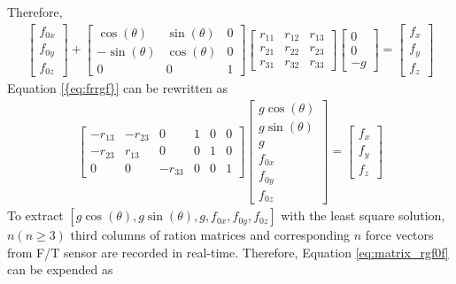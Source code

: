 Therefore,
\begin{equation}
\label{eq:frrgf}
\begin{split}
\begin{bmatrix}
f_{0x}\\
f_{0y}\\
f_{0z}
\end{bmatrix}
+
\begin{bmatrix}
\cos(\theta)	&\sin(\theta)	&0 \\
-\sin(\theta)	&\cos(\theta)	&0 \\
0				&0				&1
\end{bmatrix}
\begin{bmatrix}
r_{11}		&r_{12}		&r_{13} \\
r_{21}		&r_{22}		&r_{23} \\
r_{31}		&r_{32}		&r_{33}
\end{bmatrix}
\begin{bmatrix}
0\\
0\\
-g
\end{bmatrix}
=
\begin{bmatrix}
f_x\\
f_y\\
f_z
\end{bmatrix}
\end{split}
\end{equation}
Equation \ref{{eq:frrgf}} can be rewritten as 
\begin{equation}
\label{eq:matrix_rgf0f}
\begin{split}
\begin{bmatrix}
-r_{13}		&-r_{23} 	&0			&1		&0		&0\\
-r_{23}		&r_{13}		&0			&0		&1		&0\\
0			&0			&-r_{33}	&0		&0		&1
\end{bmatrix}
\begin{bmatrix}
g\cos(\theta)\\
g\sin(\theta)\\
g\\
f_{0x}\\
f_{0y}\\
f_{0z}
\end{bmatrix}
=
\begin{bmatrix}
f_x\\
f_y\\
f_z
\end{bmatrix}
\end{split}
\end{equation}
To extract $[g\cos(\theta),g\sin(\theta),g,f_{0x},f_{0y},f_{0z}]$ with the least square solution, $n(n\geq3)$ third columns of ration matrices and corresponding $n$ force vectors from F/T sensor are recorded in real-time. Therefore, Equation \ref{eq:matrix_rgf0f} can be expended as
